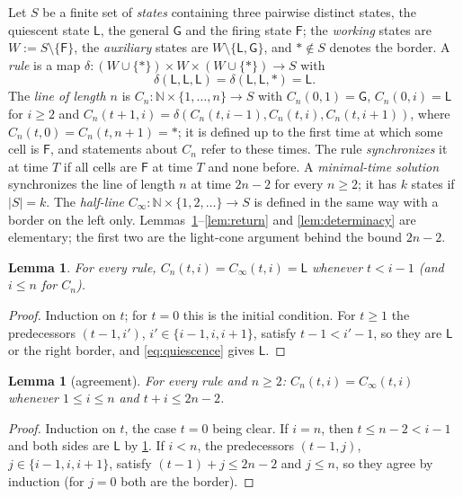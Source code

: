 \documentclass[3p]{elsarticle}
\newtheorem{lemma}[theorem]{Lemma}
\theoremstyle{remark}
\begin{document}
Let $S$ be a finite set of \emph{states} containing three pairwise distinct
states, the quiescent state $\mathsf L$, the general $\mathsf G$ and the firing
state $\mathsf F$; the \emph{working} states are $W:=S\setminus\{\mathsf F\}$,
the \emph{auxiliary} states are $W\setminus\{\mathsf L,\mathsf G\}$, and
$\ast\notin S$ denotes the border. A \emph{rule} is a map
$\delta:(W\cup\{\ast\})\times W\times(W\cup\{\ast\})\to S$ with
\begin{equation}\label{eq:quiescence}
\delta(\mathsf L,\mathsf L,\mathsf L)=\delta(\mathsf L,\mathsf L,\ast)=\mathsf L .
\end{equation}
The \emph{line of length $n$} is $C_n:\mathbb N\times\{1,\dots,n\}\to S$ with
$C_n(0,1)=\mathsf G$, $C_n(0,i)=\mathsf L$ for $i\ge2$ and
$C_n(t+1,i)=\delta(C_n(t,i-1),C_n(t,i),C_n(t,i+1))$, where
$C_n(t,0)=C_n(t,n+1)=\ast$; it is defined up to the first time at which some
cell is $\mathsf F$, and statements about $C_n$ refer to these times. The rule
\emph{synchronizes} it at time $T$ if all cells are $\mathsf F$ at time $T$ and
none before. A \emph{minimal-time solution} synchronizes the line of length $n$
at time $2n-2$ for every $n\ge2$; it has $k$ states if $|S|=k$. The
\emph{half-line} $C_\infty:\mathbb N\times\{1,2,\dots\}\to S$ is defined in the
same way with a border on the left only. Lemmas~\ref{lem:lightcone}--\ref{lem:return}
and \ref{lem:determinacy} are elementary; the first two are the light-cone
argument behind the bound $2n-2$.

\begin{lemma}\label{lem:lightcone}
For every rule, $C_n(t,i)=C_\infty(t,i)=\mathsf L$ whenever $t<i-1$ (and
$i\le n$ for $C_n$).
\end{lemma}

\begin{proof}
Induction on $t$; for $t=0$ this is the initial condition. For $t\ge1$ the
predecessors $(t-1,i')$, $i'\in\{i-1,i,i+1\}$, satisfy $t-1<i'-1$, so they are
$\mathsf L$ or the right border, and \eqref{eq:quiescence} gives $\mathsf L$.
\end{proof}

\begin{lemma}[agreement]\label{lem:agree}
For every rule and $n\ge2$: $C_n(t,i)=C_\infty(t,i)$ whenever $1\le i\le n$
and $t+i\le 2n-2$.
\end{lemma}

\begin{proof}
Induction on $t$, the case $t=0$ being clear. If $i=n$, then $t\le n-2<i-1$
and both sides are $\mathsf L$ by \cref{lem:lightcone}. If $i<n$, the
predecessors $(t-1,j)$, $j\in\{i-1,i,i+1\}$, satisfy $(t-1)+j\le 2n-2$ and
$j\le n$, so they agree by induction (for $j=0$ both are the border).
\end{proof}
\end{document}
